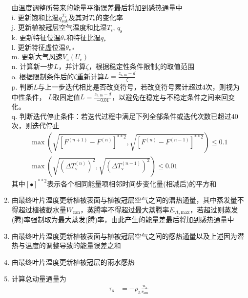 \begin{enumerate}
    由温度调整所带来的能量平衡误差最后将加到感热通量中\\
    i. 更新饱和比湿$q_{\mathrm{sat}}^{T_{\mathrm v}}$及其对$T_{\mathrm v}$的变化率 \\
    j. 更新植被冠层空气温度和比湿$T_{\mathrm {s}}$, $q_{\mathrm {s}}$ \\
    k. 更新特征位温$\theta_\ast$和特征比湿$q_\ast$ \\
    l. 更新特征虚位温$\theta_{\mathrm{v\ast}}$ \\
    m. 更新大气风速$V_{\mathrm a}\left(U_{\mathrm c}\right)$ \\
    n. 计算新一步$L$，并计算$\zeta$，根据稳定性条件限制$\zeta$的取值范围 \\
    o. 根据限制条件后的$\zeta$重新计算$L=\frac{z_{\mathrm{a,m}}-d}{\zeta}$ \\
    p. 判断$L$与上一步迭代相比是否改变符号，若改变符号累计超过4次，则视为中性条件，
    $L$取固定值$L=\frac{z_{\mathrm{a,m}}-d}{-0.01}$，以避免在稳定与不稳定条件之间来回变化。\\
    q. 判断迭代停止条件：若迭代过程中满足下列全部条件或迭代次数已超过40次，则迭代停止
    \begin{equation}\label{eq:iterstop}
      \begin{array}{l}\max\left( \sqrt{\left[F^{(n+1)}-F^{(n)}\right]^{\ast\ast2}}, \sqrt{\left[F^{(n)}-F^{(n-1)}\right]^{\ast\ast2}} \right) \leqslant 0.1 \\[3.0 ex]
      \max\left( \sqrt{\left(\Delta T_{\mathrm{v}}^{(n)}\right)^{2}}, \sqrt{\left(\Delta T_{\mathrm{v}}^{(n-1)}\right)^{2}} \right) \leqslant 0.01\end{array}
    \end{equation}
    其中$\left[\bullet\right]^{\ast\ast2}$表示各个相同能量项相邻时间步变化量(相减后)的平方和
  \item 由最终叶片温度更新植被表面与植被冠层空气之间的潜热通量，其中蒸发量不得超过植被截水量$W_{\mathrm{can}}$，蒸腾率不得超过最大蒸腾率$ E_{\mathrm{vt,max}}$，若超过则蒸发(腾)率强制取为最大蒸发(腾)率，由此产生的能量差最后将加到感热通量中
  \item 由最终叶片温度更新植被表面与植被冠层空气之间的感热通量以及上述因为潜热与温度的调整导致的能量误差之和
  \item 由最终叶片温度更新植被冠层的雨水感热
  \item 计算总动量通量为
    \begin{equation}
      \begin{aligned}
        \tau_{\mathrm{x}} &=- \rho_{\mathrm{a}} \frac{u_{\mathrm{a}}}{r_{\mathrm{a m}}} \\[1ex]

\end{aligned}
\end{equation}
\end{enumerate}
